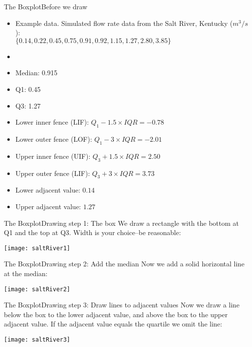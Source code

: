 \documentclass[xcolor=dvipsnames]{beamer}
\begin{document}
\begin{frame}{The Boxplot}{Before we draw}
	\begin{itemize}
		\item Example data. Simulated flow rate data from the Salt River, Kentucky ($m^3 / s$): \\
		$\{0.14, 0.22, 0.45, 0.75, 0.91, 0.92, 1.15, 1.27, 2.80, 3.85\}$
		\item[]
		\item Median: 0.915
		\item Q1: 0.45
		\item Q3: 1.27
		\item Lower inner fence (LIF): $Q_1 - 1.5 \times IQR = -0.78 $
		\item Lower outer fence (LOF): $Q_1 - 3 \times IQR = -2.01$
		\item Upper inner fence (UIF): $Q_3 + 1.5 \times IQR = 2.50 $
		\item Upper outer fence (LIF): $Q_3 + 3 \times IQR = 3.73 $
		\item Lower adjacent value: $0.14$
		\item Upper adjacent value: $1.27$
	\end{itemize}
\end{frame}

\begin{frame}{The Boxplot}{Drawing step 1: The box}
	We draw a rectangle with the bottom at Q1 and the top at Q3. Width is your choice--be reasonable:
	\begin{center}
		\texttt{[image: saltRiver1]}
	\end{center}
\end{frame}

\begin{frame}{The Boxplot}{Drawing step 2: Add the median}
	Now we add a solid horizontal line at the median:
	\begin{center}
		\texttt{[image: saltRiver2]}
	\end{center}
\end{frame}

\begin{frame}{The Boxplot}{Drawing step 3: Draw lines to adjacent values}
	Now we draw a line below the box to the lower adjacent value, and above the box to the upper adjacent value. If the adjacent value equals the quartile we omit the line:
	\begin{center}
		\texttt{[image: saltRiver3]}
	\end{center}
\end{frame}
\end{document}
